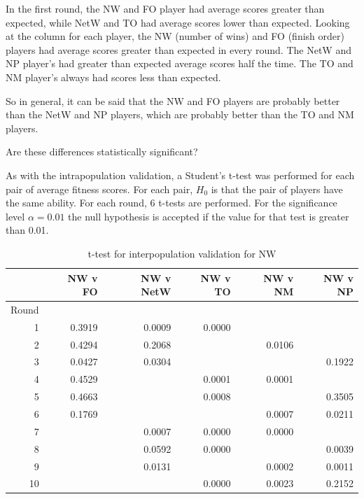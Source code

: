 In the first round, the NW and FO player had average scores greater than
expected, while NetW and TO had average scores lower than expected. Looking at
the column for each player, the NW (number of wins) and FO (finish order)
players had average scores greater than expected in every round. The NetW and NP
player's had greater than expected average scores half the time. The TO and NM
player's always had scores less than expected.

So in general, it can be said that the NW and FO players are probably better
than the NetW and NP players, which are probably better than the TO and NM
players.

Are these differences statistically significant?

As with the intrapopulation validation, a Student's t-test was performed for
each pair of average fitness scores. For each pair, $H_{0}$ is that the pair of
players have the same ability. For each round, 6 t-tests are performed. For the
significance level \(\alpha=0.01\) the null hypothesis is accepted if the
value for that test is greater than 0.01. 

\begin{table}[htbp]
  \centering
  \caption{t-test for interpopulation validation for NW}
    \begin{tabular}{rrrrrr}
    \toprule
          & NW v FO & NW v NetW & NW v TO & NW v NM & NW v NP \\
    \midrule
    Round &         &           &         &         &        \\
    1     & 0.3919  & 0.0009    & 0.0000  &         &        \\
    2     & 0.4294  & 0.2068    &         & 0.0106  &        \\
    3     & 0.0427  & 0.0304    &         &         & 0.1922 \\
    4     & 0.4529  &           & 0.0001  & 0.0001  &        \\
    5     & 0.4663  &           & 0.0008  &         & 0.3505 \\
    6     & 0.1769  &           &         & 0.0007  & 0.0211 \\
    7     &         & 0.0007    & 0.0000  & 0.0000  &        \\
    8     &         & 0.0592    & 0.0000  &         & 0.0039 \\
    9     &         & 0.0131    &         & 0.0002  & 0.0011 \\
    10    &         &           & 0.0000  & 0.0023  & 0.2152 \\
    \bottomrule
    \end{tabular}%
  \label{tab:interpop_ttest1}%
\end{table}%


